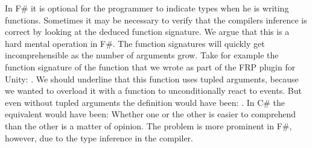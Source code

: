 In F\# it is optional for the programmer to indicate types when he is writing functions. Sometimes it may be necessary to verify that the compilers inference is correct by looking at the deduced function signature. We argue that this is a hard mental operation in F\#. The function signatures will quickly get incomprehensible as the number of arguments grow. Take for example the function signature of the  function that we wrote as part of the \gls{FRP} plugin for Unity: 
\newline
{}.\newline
We should underline that this function uses tupled arguments, because we wanted to overload it with a function to unconditionally react to events. But even without tupled arguments the definition would have been:\newline
{}.\newline
In C\# the equivalent would have been:\newline
{}\newline
Whether one or the other is easier to comprehend than the other is a matter of opinion. The problem is more prominent in F\#, however, due to the type inference in the compiler.